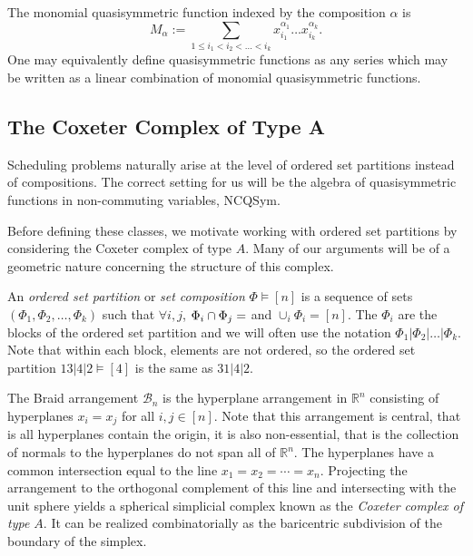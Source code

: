 \documentclass[12pt,reqno]{amsart}
\numberwithin{definition}{section}
\begin{document}
The monomial quasisymmetric function indexed by the composition $\alpha$ is 
$$M_{\alpha} := \sum_{1 \leq i_1 < i_2 < \ldots < i_k}
x_{i_1}^{\alpha_1} \ldots x_{i_k}^{\alpha_k}.$$  One may equivalently
define quasisymmetric functions as any series which may be written as a
linear combination of monomial quasisymmetric functions.




\subsection{The Coxeter Complex of Type A}
Scheduling problems naturally arise at the level of ordered set partitions instead of
compositions.  The correct setting for us will be the algebra of  
quasisymmetric functions in non-commuting variables, NCQSym.

Before defining these classes, we motivate working with ordered set
partitions by considering the Coxeter complex of type $A$.  Many of
our arguments will be of a geometric nature concerning the structure
of this complex.


An \emph{ordered set partition} or \emph{set composition} $\Phi \vDash
[n]$ is a sequence of sets $(\Phi_1, \Phi_2, \ldots, \Phi_k)$ such that $\forall
i,j$, $ \Phi_i \cap \Phi_j = \empty$ and $\cup_i \Phi_i = [n]$.  The $\Phi_i$ are the
blocks of the ordered set partition and we will often use the notation
$\Phi_1| \Phi_2| \ldots| \Phi_k$.  Note that within each block, elements are
not ordered, so the ordered set partition $13|4|2 \vDash [4]$ is the
same as $31|4|2$.



The Braid arrangement $\mathcal{B}_n$ is the hyperplane arrangement in
$\mathbb{R}^n$ consisting of hyperplanes $x_i = x_j$ for all $i,j \in [n]$.
Note that this arrangement is central, that is all hyperplanes contain
the origin, it is also non-essential, that is the collection of
normals to the hyperplanes do not span all of $\mathbb{R}^n$.  The
hyperplanes have a common intersection equal to the line $x_1 = x_2 = \cdots
= x_n$.  Projecting the arrangement to the orthogonal complement of
this line and intersecting with the unit sphere yields a spherical
simplicial complex known as the \emph{Coxeter complex of type $A$}.
It can be realized combinatorially as the baricentric subdivision of the
boundary of the simplex. 
\end{document}
